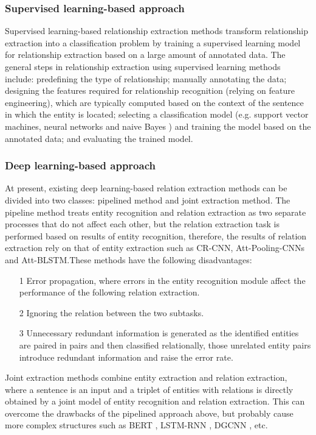 \documentclass[%
 aip,
 jmp,%
 amsmath,amssymb,
 reprint,%
]{revtex4-2}
\begin{document}
\subsubsection{Supervised learning-based approach}
Supervised learning-based relationship extraction methods transform relationship extraction into a classification 
problem by training a supervised learning model for relationship extraction based on a large amount of annotated 
data. The general steps in relationship extraction using supervised learning methods include: predefining the 
type of relationship; manually annotating the data; designing the features required for relationship recognition 
(relying on feature engineering), which are typically computed based on the context of the sentence 
in which the entity is located; selecting a classification model (e.g. support vector machines\cite{huang2018applications}, 
neural networks and naive Bayes \cite{frasconi2001text}) and training the model based on the annotated data; 
and evaluating the trained model.

\subsubsection{Deep learning-based approach}
At present, existing deep learning-based relation extraction methods can be divided into two classes:
pipelined method and joint extraction method\cite{zheng2017joint}.
The pipeline method treats entity recognition and relation extraction as two separate processes that 
do not affect each other, but the relation extraction task is performed based on results of entity recognition,
therefore, the results of relation extraction rely on that of entity extraction such as CR-CNN\cite{nogueira2015classifying},
Att-Pooling-CNNs\cite{li2018attention} and Att-BLSTM\cite{chen2018wifi}.These methods have the following disadvantages:
\begin{itemize}
    \item[1] Error propagation, where errors in the entity recognition module affect the performance of the following relation extraction.
    \item[2] Ignoring the relation between the two subtasks.
    \item[3] Unnecessary redundant information is generated as the identified entities are paired in pairs and then classified relationally, those unrelated entity pairs introduce redundant information and raise the error rate.
\end{itemize}
Joint extraction methods combine entity extraction and relation extraction, where a sentence is an input 
and a triplet of entities with relations is directly obtained by a joint model of entity recognition 
and relation extraction. This can overcome the drawbacks of the pipelined approach above, but probably cause more 
complex structures such as BERT \cite{tenney2019bert}, LSTM-RNN \cite{selvin2017stock}, DGCNN \cite{phan2018dgcnn}, etc.
\end{document}
